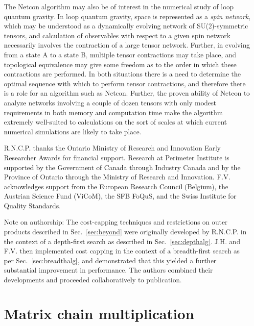 \documentclass[aps,pre,reprint,superscriptaddress,amsfonts,amsmath,showpacs,nofootinbib,floatfix]{revtex4-1}
\newcommand{\sref}[1]{Sec.~\ref{#1}}
\begin{document}
The Netcon algorithm may also be of interest in the numerical study of loop quantum gravity. In loop quantum gravity, space is represented as a \emph{spin network}, which may be understood as a dynamically evolving network of SU(2)-symmetric tensors,
and calculation of observables with respect to a given spin network necessarily involves the contraction of a large tensor network. Further, in evolving from a state A to a state B, multiple tensor contractions may take place, and %
topological equivalence may give some freedom as to the order in which these contractions are performed. In both situations there is a need to determine the optimal sequence with which to perform tensor contractions, and therefore there is a role for an algorithm such as Netcon. Further, the proven ability of Netcon to analyze networks involving a couple of dozen tensors with only modest requirements in both memory and computation time make the algorithm extremely well-suited to calculations on the sort of scales at which current numerical simulations are likely to take place.







\acknowledgments

R.N.C.P. thanks the Ontario Ministry of Research and Innovation Early Researcher Awards for financial support. Research at Perimeter Institute is supported by the Government of Canada through Industry Canada and by the Province of Ontario through the Ministry of Research and Innovation. %
F.V. acknowledges support from the European Research Council (Belgium), %
the Austrian Science Fund (ViCoM), the SFB FoQuS, and the Swiss Institute for Quality Standards.

Note on authorship: The cost-capping techniques and restrictions on outer products described in \sref{sec:beyond} were originally developed by R.N.C.P. in the context of a depth-first search as described in \sref{sec:depthalg}. J.H. and F.V. then implemented cost capping in the context of a breadth-first search as per \sref{sec:breadthalg}, and demonstrated that this yielded a further substantial improvement in performance. The authors combined their developments and proceeded collaboratively to publication.

\appendix

\section{Matrix chain multiplication\label{sec:matmult}}
\end{document}
